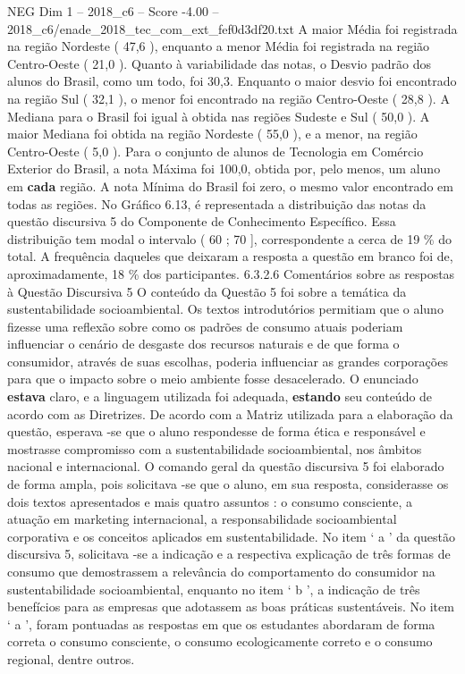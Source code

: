 \begin{textsample}{NEG Dim 1 – 2018\_c6 – Score -4.00 – 2018\_c6/enade\_2018\_tec\_com\_ext\_fef0d3df20.txt}
A maior Média foi registrada na região Nordeste ( 47,6 ), enquanto a menor Média foi registrada na região Centro-Oeste ( 21,0 ).
Quanto à variabilidade das notas, o Desvio padrão dos alunos do Brasil, como um todo, foi 30,3.
Enquanto o maior desvio foi encontrado na região Sul ( 32,1 ), o menor foi encontrado na região Centro-Oeste ( 28,8 ).
A Mediana para o Brasil foi igual à obtida nas regiões Sudeste e Sul ( 50,0 ).
A maior Mediana foi obtida na região Nordeste ( 55,0 ), e a menor, na região Centro-Oeste ( 5,0 ).
Para o conjunto de alunos de Tecnologia em Comércio Exterior do Brasil, a nota Máxima foi 100,0, obtida por, pelo menos, um aluno em \textbf{cada} região.
A nota Mínima do Brasil foi zero, o mesmo valor encontrado em todas as regiões.
No Gráfico 6.13, é representada a distribuição das notas da questão discursiva 5 do Componente de Conhecimento Específico.
Essa distribuição tem modal o intervalo ( 60 ; 70 ], correspondente a cerca de 19 \% do total.
A frequência daqueles que deixaram a resposta a questão em branco foi de, aproximadamente, 18 \% dos participantes. 6.3.2.6 Comentários sobre as respostas à Questão Discursiva 5 O conteúdo da Questão 5 foi sobre a temática da sustentabilidade socioambiental.
Os textos introdutórios permitiam que o aluno fizesse uma reflexão sobre como os padrões de consumo atuais poderiam influenciar o cenário de desgaste dos recursos naturais e de que forma o consumidor, através de suas escolhas, poderia influenciar as grandes corporações para que o impacto sobre o meio ambiente fosse desacelerado.
O enunciado \textbf{estava} claro, e a linguagem utilizada foi adequada, \textbf{estando} seu conteúdo de acordo com as Diretrizes.
De acordo com a Matriz utilizada para a elaboração da questão, esperava -se que o aluno respondesse de forma ética e responsável e mostrasse compromisso com a sustentabilidade socioambiental, nos âmbitos nacional e internacional.
O comando geral da questão discursiva 5 foi elaborado de forma ampla, pois solicitava -se que o aluno, em sua resposta, considerasse os dois textos apresentados e mais quatro assuntos : o consumo consciente, a atuação em marketing internacional, a responsabilidade socioambiental corporativa e os conceitos aplicados em sustentabilidade.
No item ‘ a ’ da questão discursiva 5, solicitava -se a indicação e a respectiva explicação de três formas de consumo que demostrassem a relevância do comportamento do consumidor na sustentabilidade socioambiental, enquanto no item ‘ b ’, a indicação de três benefícios para as empresas que adotassem as boas práticas sustentáveis.
No item ‘ a ’, foram pontuadas as respostas em que os estudantes abordaram de forma correta o consumo consciente, o consumo ecologicamente correto e o consumo regional, dentre outros.

\end{textsample}
